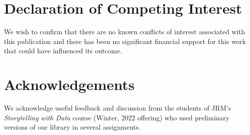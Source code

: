 \documentclass[preprint,12pt,a4paper]{elsarticle}
\begin{document}
\section*{Declaration of Competing Interest}
We wish to confirm that there are no known conflicts of interest associated with this publication and there has been no significant financial support for this work that could have influenced its outcome.


\section*{Acknowledgements}
We acknowledge useful feedback and discussion from the students of
JRM's \textit{Storytelling with Data} course (Winter, 2022 offering)
who used preliminary versions of our library in several assignments.



\end{document}
